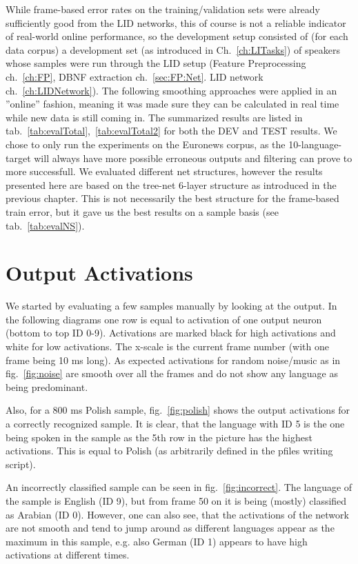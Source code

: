 While frame-based error rates on the training/validation sets were already sufficiently good from the LID networks, this of course is not a reliable indicator of real-world online performance, so the development setup consisted of (for each data corpus) a development set (as introduced in Ch.~\ref{ch:LITasks}) of speakers whose samples were run through the LID setup (Feature Preprocessing ch.~\ref{ch:FP}, DBNF extraction ch.~\ref{sec:FP:Net}. LID network ch.~\ref{ch:LIDNetwork}). The following smoothing approaches were applied in an ''online'' fashion, meaning it was made sure they can be calculated in real time while new data is still coming in. The summarized results are listed in tab.~\ref{tab:evalTotal},~\ref{tab:evalTotal2} for both the DEV and TEST results. We chose to only run the experiments on the Euronews corpus, as the 10-language-target will always have more possible erroneous outputs and filtering can prove to more successfull. We evaluated different net structures, however the results presented here are based on the tree-net 6-layer structure as introduced in the previous chapter. This is not necessarily the best structure for the frame-based train error, but it gave us the best results on a sample basis (see tab.~\ref{tab:evalNS}).

\section{Output Activations}
\label{sec:outputs}

We started by evaluating a few samples manually by looking at the output. In the following diagrams one row is equal to activation of one output neuron (bottom to top ID 0-9). Activations are marked black for high activations and white for low activations. The x-scale is the current frame number (with one frame being 10 ms long). As expected activations for random noise/music as in fig.~\ref{fig:noise} are smooth over all the frames and do not show any language as being predominant. 

Also, for a 800 ms Polish sample, fig.~\ref{fig:polish} shows the output activations for a correctly recognized sample. It is clear, that the language with ID 5 is the one being spoken in the sample as the 5th row in the picture has the highest activations. This is equal to Polish (as arbitrarily defined in the pfiles writing script). 

An incorrectly classified sample can be seen in fig.~\ref{fig:incorrect}. The language of the sample is English (ID 9), but from frame 50 on it is being (mostly) classified as Arabian (ID 0). However, one can also see, that the activations of the network are not smooth and tend to jump around as different languages appear as the maximum in this sample, e.g. also German (ID 1) appears to have high activations at different times. 

